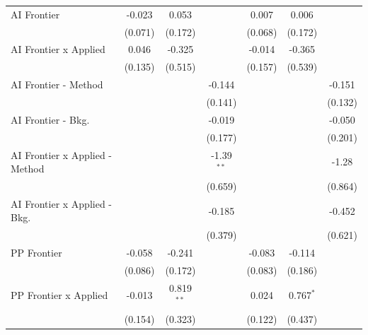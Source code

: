 \begin{tabular}{lcccccc}
   AI Frontier                    & -0.023       & 0.053        &               & 0.007        & 0.006         &   \\   
                                  & (0.071)      & (0.172)      &               & (0.068)      & (0.172)       &   \\   
   AI Frontier x Applied          & 0.046        & -0.325       &               & -0.014       & -0.365        &   \\   
                                  & (0.135)      & (0.515)      &               & (0.157)      & (0.539)       &   \\   
   AI Frontier - Method           &              &              & -0.144        &              &               & -0.151\\   
                                  &              &              & (0.141)       &              &               & (0.132)\\   
   AI Frontier - Bkg.             &              &              & -0.019        &              &               & -0.050\\   
                                  &              &              & (0.177)       &              &               & (0.201)\\   
   AI Frontier x Applied - Method &              &              & -1.39$^{**}$  &              &               & -1.28\\   
                                  &              &              & (0.659)       &              &               & (0.864)\\   
   AI Frontier x Applied - Bkg.   &              &              & -0.185        &              &               & -0.452\\   
                                  &              &              & (0.379)       &              &               & (0.621)\\   
   PP Frontier                    & -0.058       & -0.241       &               & -0.083       & -0.114        &   \\   
                                  & (0.086)      & (0.172)      &               & (0.083)      & (0.186)       &   \\   
   PP Frontier x Applied          & -0.013       & 0.819$^{**}$ &               & 0.024        & 0.767$^{*}$   &   \\   
                                  & (0.154)      & (0.323)      &               & (0.122)      & (0.437)       &   \\   

\end{tabular}
